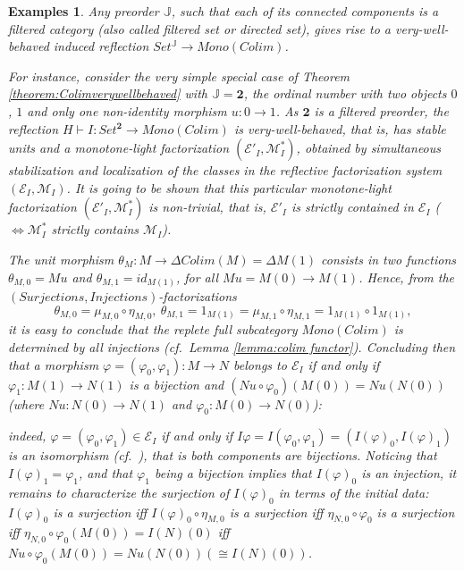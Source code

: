 \documentclass[12pt,a4paper]{amsart}
\newtheorem{examples}[example]{Examples}
\theoremstyle{definition}
\begin{document}
\begin{examples}\label{example:colimit}Any preorder $\mathbb{J}$, such that each of its connected components is a filtered category (also called filtered set or directed set), gives rise to a very-well-behaved induced reflection $Set^\mathbb{J}\rightarrow Mono(Colim)$.

 For instance, consider the very simple special case of Theorem \ref{theorem:Colimverywellbehaved} with $\mathbb{J}=\mathbf{2}$, the ordinal number with two objects $0$, $1$ and only one non-identity morphism $u:0\rightarrow 1$. As $\mathbf{2}$ is a filtered preorder, the reflection $H\vdash I:Set^\mathbf{2}\rightarrow Mono(Colim)$ is \emph{very-well-behaved}, that is, has stable units and a monotone-light factorization $(\mathcal{E}'_I,\mathcal{M}^*_I)$, obtained by simultaneous stabilization and localization of the classes in the reflective factorization system $(\mathcal{E}_I,\mathcal{M}_I)$. It is going to be shown that this particular monotone-light factorization $(\mathcal{E}'_I,\mathcal{M}^*_I)$ is non-trivial, that is, $\mathcal{E}'_I$ is strictly contained in $\mathcal{E}_I$ ($\Leftrightarrow\mathcal{M}^*_I$ strictly contains $\mathcal{M}_I$).

The unit morphism $\theta_M:M\rightarrow\Delta Colim(M)=\Delta M(1)$ consists in two functions $\theta_{M,0}=Mu$ and $\theta_{M,1}=id_{M(1)}$, for all $Mu=M(0)\rightarrow M(1)$. Hence, from the $(Surjections, Injections)$-factorizations $$\theta_{M,0}=\mu_{M,0}\circ\eta_{M,0},\ \theta_{M,1}=1_{M(1)}=\mu_{M,1}\circ\eta_{M,1}=1_{M(1)}\circ 1_{M(1)},$$ \noindent it is easy to conclude that the replete full subcategory $Mono(Colim)$ is determined by all injections (cf.\ Lemma \ref{lemma:colim functor}).
Concluding then that a morphism $\varphi =(\varphi_0,\varphi_1):M\rightarrow N$ belongs to $\mathcal{E}_I$ if and only if $\varphi_1:M(1)\rightarrow N(1)$ is a bijection and $(Nu\circ\varphi_0)(M(0))=Nu(N(0))$ (where $Nu:N(0)\rightarrow N(1)$ and $\varphi_0:M(0)\rightarrow N(0)$):

\noindent indeed, $\varphi =(\varphi_0,\varphi_1)\in\mathcal{E}_I$ if and only if $I\varphi =I(\varphi_0,\varphi_1)=(I(\varphi)_0,I(\varphi)_1)$ is an isomorphism (cf.\ \cite[(3.2) in 3.1]{CJKP:stab}), that is both components are bijections. Noticing that $I(\varphi)_1=\varphi_1$, and that $\varphi_1$ being a bijection implies that $I(\varphi)_0$ is an injection, it remains to characterize the surjection of $I(\varphi)_0$ in terms of the initial data: $I(\varphi)_0$ is a surjection iff $I(\varphi)_0\circ\eta_{M,0}$ is a surjection iff $\eta_{N,0}\circ\varphi_0$ is a surjection iff $\eta_{N,0}\circ\varphi_0(M(0))=I(N)(0)$ iff $Nu\circ\varphi_0(M(0))=Nu(N(0))(\cong I(N)(0))$.


\end{examples}
\end{document}
